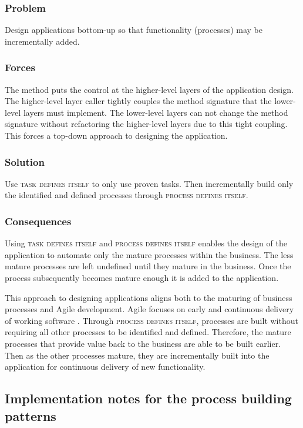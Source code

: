 \documentclass[prodmode]{style/acmlarge}
\begin{document}
\subsubsection*{\textbf{Problem}} Design applications bottom-up so that
functionality (processes) may be incrementally added.

\subsubsection*{Forces} The method puts the control at the higher-level layers
of the application design.  The higher-level layer caller tightly couples the
method signature that the lower-level layers must implement.  The lower-level
layers can not change the method signature without refactoring the higher-level
layers due to this tight coupling.  This forces a top-down approach to designing
the application.

\subsubsection*{\textbf{Solution}} Use \textsc{task defines itself} to only use
proven tasks.  Then incrementally build only the identified and defined
processes through \textsc{process defines itself}.

\subsubsection*{Consequences} Using \textsc{task defines itself} and
\textsc{process defines itself} enables the design of the application to
automate only the mature processes within the business.  The less mature
processes are left undefined until they mature in the business.  Once the
process subsequently becomes mature enough it is added to the application.

This approach to designing applications aligns both to the maturing of business
processes and Agile development.  Agile focuses on early and continuous delivery
of working software \cite{agile-manifesto}.  Through \textsc{process defines
itself}, processes are built without requiring all other processes to be
identified and defined.  Therefore, the mature processes that provide value back
to the business are able to be built earlier.  Then as the other processes
mature, they are incrementally built into the application for continuous
delivery of new functionality.


\subsection{\textbf{Implementation notes for the process building patterns}}
\end{document}
